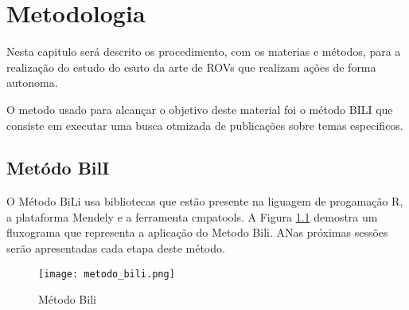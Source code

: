 \chapter{Metodologia}
\label{chap:metod}
Nesta capitulo será descrito os procedimento, com os materias e métodos, para a realização do estudo do esuto da arte de ROVs que realizam ações de forma autonoma.

O metodo usado para alcançar o objetivo deste material foi o método BILI que consiste em executar uma busca otmizada de publicações sobre temas especificos.

\section{Metódo BilI}

O Método BiLi usa bibliotecas que estão presente na liguagem de progamação R,  a plataforma Mendely e a ferramenta cmpatools. A Figura \ref{fig:metodo_bili} demostra um fluxograma que representa a aplicação do Metodo Bili.  ANas próximas sessões serão apresentadas  cada etapa deste método.

\begin{figure}
    \centering
   
    \texttt{[image: metodo\_bili.png]}
    \caption{Método Bili}
    \label{fig:metodo_bili}
\end{figure}
